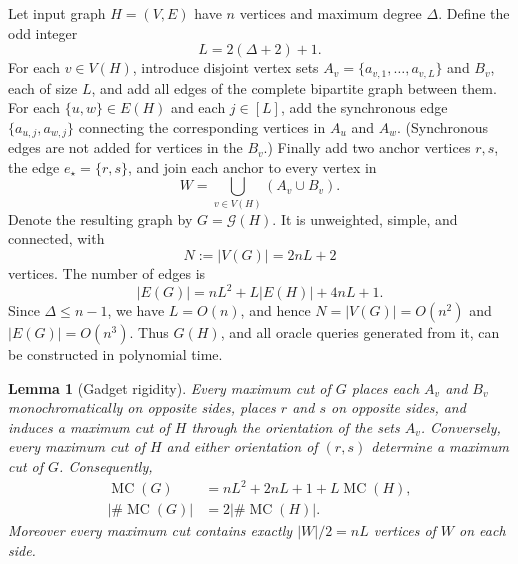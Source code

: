 \documentclass[11pt]{article}
\newtheorem{lemma}[theorem]{Lemma}
\newcommand{\mc}{\operatorname{MC}}
\newcommand{\M}{\#\mc}
\newcommand{\sh}[1]{{#1}}
\begin{document}
Let input graph $H=(V,E)$ have $n$ vertices and maximum degree $\Delta$.  
Define the odd integer
\begin{equation}
 L=2(\Delta+2)+1.
 \label{eq:L}
\end{equation}
For each $v\in V( H)$, introduce disjoint vertex sets $A_v=\{a_{v,1},…,a_{v,L}\}$ and $B_v$, each of size $L$, and add all
edges of the complete bipartite graph between them.  For each
$\{u,w\}\in E(H)$ and each $j\in[L]$, add the synchronous edge
$\{a_{u,j},a_{w,j}\}$ connecting %
the corresponding vertices in $A_u$ and $A_w$.  (Synchronous edges are not added for vertices in the $B_v$.) Finally add two anchor vertices $r,s$, the edge $e_\star=\{r,s\}$, and
join each anchor to every vertex in
\begin{equation}
 W=\bigcup_{v\in V(H)}(A_v\cup B_v).
\end{equation}
Denote the resulting graph by $G=\mathcal G( H)$.  It is unweighted, simple, and
connected, with
\begin{equation}
 N:=|V(G)|=2 nL+2 
 \label{eq:N}
\end{equation}
\sh{vertices. The number of edges is
\begin{equation}
  |E(G)|
  =
  nL^2+L|E(H)|+4nL+1.
\end{equation}
Since \(\Delta\le n-1\), we have \(L=O(n)\), and hence
 $N=|V(G)|=O(n^2)$ and 
 $ |E(G)|=O(n^3)$. 
Thus \(G(H)\), and all oracle queries generated from it, can be
constructed in polynomial time.  }

\begin{lemma}[Gadget rigidity]\label{lem:rigidity}
Every maximum cut of $G$ places each $A_v$ and $B_v$ monochromatically on opposite sides,
places $r$ and $s$ on opposite sides, and induces a maximum cut of $H$ through the
orientation of the sets $A_v$.  Conversely, every maximum cut of $H$ and either
orientation of $(r,s)$ determine a maximum cut of $G$.  Consequently,
\begin{align}
 \mc(G)&= nL^2+2 nL+1+L\mc( H),
 \label{eq:MCG}\\
 |\M(G)|&=2|\M(H)|.
 \label{eq:MG}
\end{align}
Moreover every maximum cut contains exactly $|W|/2= nL$ vertices of $W$ on each
side.
\end{lemma}
\end{document}
